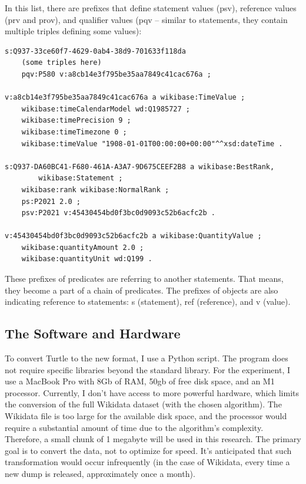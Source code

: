 In this list, there are prefixes that define statement values (psv), reference values (prv and prov), and qualifier values (pqv – similar to statements, they contain multiple triples defining some values):

{\footnotesize
\begin{verbatim}
s:Q937-33ce60f7-4629-0ab4-38d9-701633f118da
    (some triples here)
    pqv:P580 v:a8cb14e3f795be35aa7849c41cac676a ;

v:a8cb14e3f795be35aa7849c41cac676a a wikibase:TimeValue ;
    wikibase:timeCalendarModel wd:Q1985727 ;
    wikibase:timePrecision 9 ;
    wikibase:timeTimezone 0 ;
    wikibase:timeValue "1908-01-01T00:00:00+00:00"^^xsd:dateTime .

s:Q937-DA60BC41-F680-461A-A3A7-9D675CEEF2B8 a wikibase:BestRank,
        wikibase:Statement ;
    wikibase:rank wikibase:NormalRank ;
    ps:P2021 2.0 ;
    psv:P2021 v:45430454bd0f3bc0d9093c52b6acfc2b .

v:45430454bd0f3bc0d9093c52b6acfc2b a wikibase:QuantityValue ;
    wikibase:quantityAmount 2.0 ;
    wikibase:quantityUnit wd:Q199 .
\end{verbatim}
}

These prefixes of predicates are referring to another statements. That means, they become a part of a chain of predicates. The prefixes of objects are also indicating reference to statements: s (statement), ref (reference), and v (value).

\subsection{The Software and Hardware}
To convert Turtle to the new format, I use a Python script. The program does not require specific libraries beyond the standard library. For the experiment, I use a MacBook Pro with 8Gb of RAM, 50gb of free disk space, and an M1 processor. Currently, I don't have access to more powerful hardware, which limits the conversion of the full Wikidata dataset (with the chosen algorithm). The Wikidata file is too large for the available disk space, and the processor would require a substantial amount of time due to the algorithm's complexity. Therefore, a small chunk of 1 megabyte will be used in this research. The primary goal is to convert the data, not to optimize for speed. It's anticipated that such transformation would occur infrequently (in the case of Wikidata, every time a new dump is released, approximately once a month).

